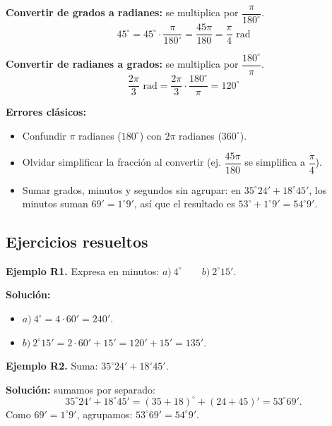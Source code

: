 \documentclass[12pt, letterpaper]{article}
\begin{document}
\begin{cuadropasos}
  \textbf{Convertir de grados a radianes:} se multiplica por $\dfrac{\pi}{180^{\circ}}$.
  $$45^{\circ} = 45^{\circ} \cdot \frac{\pi}{180^{\circ}} = \frac{45\pi}{180} = \frac{\pi}{4} \text{ rad}$$

  \textbf{Convertir de radianes a grados:} se multiplica por $\dfrac{180^{\circ}}{\pi}$.
  $$\frac{2\pi}{3} \text{ rad} = \frac{2\pi}{3} \cdot \frac{180^{\circ}}{\pi} = 120^{\circ}$$
\end{cuadropasos}

\begin{cuadroadvertencia}
  \textbf{Errores clásicos:}
  \begin{itemize}[leftmargin=*]
    \item Confundir $\pi$ radianes ($180^{\circ}$) con $2\pi$ radianes ($360^{\circ}$).
    \item Olvidar simplificar la fracción al convertir (ej. $\dfrac{45\pi}{180}$ se simplifica a $\dfrac{\pi}{4}$).
    \item Sumar grados, minutos y segundos sin agrupar: en $35^{\circ} 24' + 18^{\circ} 45'$, los minutos suman $69' = 1^{\circ} 9'$, así que el resultado es $53^{\circ} + 1^{\circ} 9' = 54^{\circ} 9'$.
  \end{itemize}
\end{cuadroadvertencia}

\subsection{Ejercicios resueltos}

\textbf{Ejemplo R1.} Expresa en minutos: $a)\ 4^{\circ} \qquad b)\ 2^{\circ} 15'$.

\begin{cuadrosolucion}
  \textbf{Solución:}
  \begin{itemize}
    \item $a)\ 4^{\circ} = 4 \cdot 60' = 240'$.
    \item $b)\ 2^{\circ} 15' = 2 \cdot 60' + 15' = 120' + 15' = 135'$.
  \end{itemize}
\end{cuadrosolucion}

\textbf{Ejemplo R2.} Suma: $35^{\circ} 24' + 18^{\circ} 45'$.

\begin{cuadrosolucion}
  \textbf{Solución:} sumamos por separado:
  $$35^{\circ} 24' + 18^{\circ} 45' = (35 + 18)^{\circ} + (24 + 45)' = 53^{\circ} 69'.$$
  Como $69' = 1^{\circ} 9'$, agrupamos: $53^{\circ} 69' = 54^{\circ} 9'$.
\end{cuadrosolucion}
\end{document}
